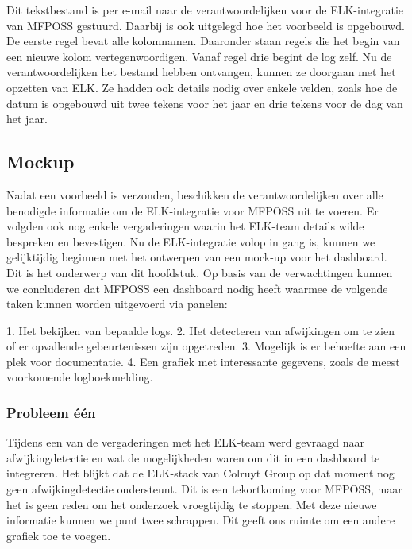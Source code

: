 Dit tekstbestand is per e-mail naar de verantwoordelijken voor de ELK-integratie van MFPOSS gestuurd. Daarbij is ook uitgelegd hoe het voorbeeld is opgebouwd. De eerste regel bevat alle kolomnamen. Daaronder staan regels die het begin van een nieuwe kolom vertegenwoordigen. Vanaf regel drie begint de log zelf. Nu de verantwoordelijken het bestand hebben ontvangen, kunnen ze doorgaan met het opzetten van ELK. Ze hadden ook details nodig over enkele velden, zoals hoe de datum is opgebouwd uit twee tekens voor het jaar en drie tekens voor de dag van het jaar.

\subsection{Mockup}
Nadat een voorbeeld is verzonden, beschikken de verantwoordelijken over alle benodigde informatie om de ELK-integratie voor MFPOSS uit te voeren. Er volgden ook nog enkele vergaderingen waarin het ELK-team details wilde bespreken en bevestigen. Nu de ELK-integratie volop in gang is, kunnen we gelijktijdig beginnen met het ontwerpen van een mock-up voor het dashboard. Dit is het onderwerp van dit hoofdstuk. Op basis van de verwachtingen kunnen we concluderen dat MFPOSS een dashboard nodig heeft waarmee de volgende taken kunnen worden uitgevoerd via panelen:

1. Het bekijken van bepaalde logs.
2. Het detecteren van afwijkingen om te zien of er opvallende gebeurtenissen zijn opgetreden.
3. Mogelijk is er behoefte aan een plek voor documentatie.
4. Een grafiek met interessante gegevens, zoals de meest voorkomende logboekmelding.

\subsubsection{Probleem één}
Tijdens een van de vergaderingen met het ELK-team werd gevraagd naar afwijkingdetectie en wat de mogelijkheden waren om dit in een dashboard te integreren. Het blijkt dat de ELK-stack van Colruyt Group op dat moment nog geen afwijkingdetectie ondersteunt. Dit is een tekortkoming voor MFPOSS, maar het is geen reden om het onderzoek vroegtijdig te stoppen. Met deze nieuwe informatie kunnen we punt twee schrappen. Dit geeft ons ruimte om een andere grafiek toe te voegen.

